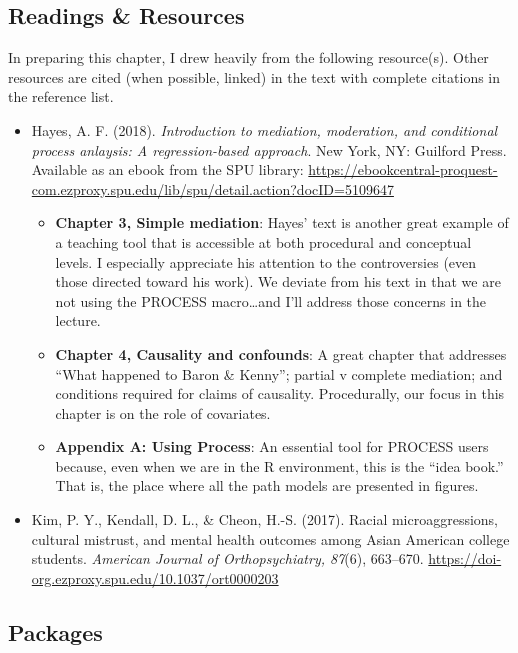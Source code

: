\documentclass[
  11pt,
]{book}
\providecommand{\tightlist}{%
  \setlength{\itemsep}{0pt}\setlength{\parskip}{0pt}}
\begin{document}
\hypertarget{readings-resources-4}{%
\subsection{Readings \& Resources}\label{readings-resources-4}}

In preparing this chapter, I drew heavily from the following resource(s). Other resources are cited (when possible, linked) in the text with complete citations in the reference list.

\begin{itemize}
\tightlist
\item
  Hayes, A. F. (2018). \emph{Introduction to mediation, moderation, and conditional process anlaysis: A regression-based approach}. New York, NY: Guilford Press. Available as an ebook from the SPU library: \url{https://ebookcentral-proquest-com.ezproxy.spu.edu/lib/spu/detail.action?docID=5109647}

  \begin{itemize}
  \tightlist
  \item
    \textbf{Chapter 3, Simple mediation}: Hayes' text is another great example of a teaching tool that is accessible at both procedural and conceptual levels. I especially appreciate his attention to the controversies (even those directed toward his work). We deviate from his text in that we are not using the PROCESS macro\ldots and I'll address those concerns in the lecture.
  \item
    \textbf{Chapter 4, Causality and confounds}: A great chapter that addresses ``What happened to Baron \& Kenny''; partial v complete mediation; and conditions required for claims of causality. Procedurally, our focus in this chapter is on the role of covariates.
  \item
    \textbf{Appendix A: Using Process}: An essential tool for PROCESS users because, even when we are in the R environment, this is the ``idea book.'' That is, the place where all the path models are presented in figures.
  \end{itemize}
\item
  Kim, P. Y., Kendall, D. L., \& Cheon, H.-S. (2017). Racial microaggressions, cultural mistrust, and mental health outcomes among Asian American college students. \emph{American Journal of Orthopsychiatry, 87}(6), 663--670. \url{https://doi-org.ezproxy.spu.edu/10.1037/ort0000203}
\end{itemize}

\hypertarget{packages-4}{%
\subsection{Packages}\label{packages-4}}
\end{document}

